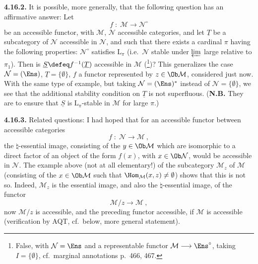 \textbf{4.16.2.} It is possible, more generally, that the following question has an affirmative answer: Let
\[
f \;:\; \mathcal{M} \longrightarrow \mathcal{N}^\circ
\]
be an accessible functor, with $\mathcal{M}$, $\mathcal{N}$ accessible categories, and let $\underline{T}$ be a subcategory of $\mathcal{N}$ accessible in $\mathcal{N}$, and such that there exists a cardinal $\pi$ having the following properties: $\mathcal{N}^\circ$ satisfies $\mathrm{L}_\pi$ (i.e.\ $\mathcal{N}$ stable under $\varprojlim$ large relative to $\pi_1$). Then is $\underline{S} \defeq f^{-1}(\underline{T})$ accessible in $\mathcal{M}$ (\footnote[191]{False, with $\mathcal{N} = \Ens$ and a representable functor $\mathcal{M} \longrightarrow \Ens^\circ$, taking $I = \{\emptyset\}$, cf.\ marginal annotations p.~466, 467.})? This generalizes the case $\mathcal{N} = (\Ens)$, $\underline{T} = \{\emptyset\}$, $f$ a functor represented by $z \in \Ob\mathcal{M}$, considered just now. With the same type of example, but taking $\mathcal{N} = (\Ens)^*$
instead of $\mathcal{N} = \{\emptyset\}$, we see that the additional stability condition on $\underline{T}$ is not
superfluous. (\textbf{N.B.} They are to ensure that $\underline{S}$ is $\mathrm{L}_\pi$-stable in $\mathcal{M}$ for large $\pi$.) %

\textbf{4.16.3.} Related questions: I had hoped that for an accessible functor between accessible categories %
\[
f \;:\; \mathcal{N} \longrightarrow \mathcal{M}\ ,
\]
the $\natural$-essential image, consisting of the $y \in \Ob\mathcal{M}$ which are isomorphic to a direct factor of an object of the form $f(x)$, with $x \in \Ob\mathcal{N}$, would be accessible in $\mathcal{N}$. The example above (not at all elementary!) of the subcategory $\mathcal{M}_z$ of $\mathcal{M}$ (consisting of the $x \in \Ob\mathcal{M}$ such that $\Hom_{\mathcal{M}}(x,z) \neq \emptyset$) shows that this is not so. Indeed, $\mathcal{M}_z$ is the essential image, and also the $\natural$-essential image, of the functor
\[
\mathcal{M}/z \longrightarrow \mathcal{M}\ ,
\]
now $\mathcal{M}/z$ is accessible, and the preceding functor accessible, if $\mathcal{M}$ is accessible (verification by AQT, cf.\ below, more general statement).


